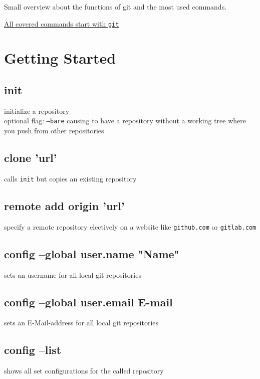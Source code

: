 Small overview about the functions of git and the most used commands.
\begin{center}
	\underline{\underline{All covered commands start with \texttt{git}}}\\
\end{center}

\section*{Getting Started}


\subsection*{init} 
initialize a repository\\
optional flag: \texttt{---bare} causing to have 
a repository without a working tree where you push from other repositories \\ 

\subsection*{clone 'url'}
calls \texttt{init} but copies an existing repository\\

\subsection*{remote add origin 'url'}
specify a remote repository electively on a website like \texttt{github.com} or \texttt{gitlab.com}\\

\subsection*{config --global user.name "Name"}
sets an username for all local git repositories\\

\subsection*{config --global user.email E-mail}
sets an E-Mail-address for all local git repositories\\

\subsection*{config --list}
shows all set configurations for the called repository \\

